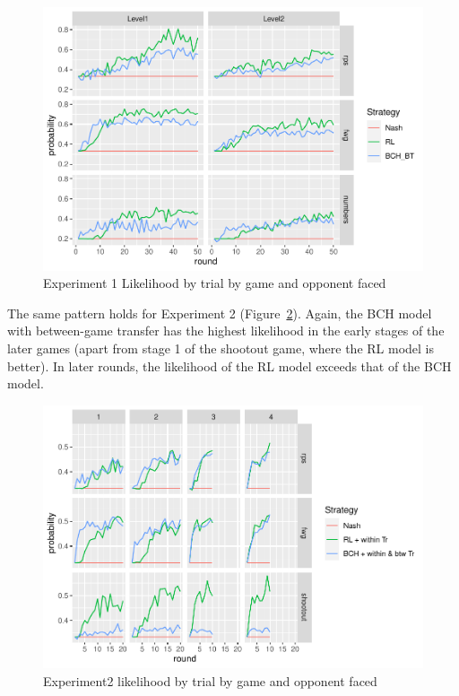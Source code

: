 \documentclass[man,floatsintext]{apa6}
\begin{document}
\begin{figure}

{\centering \includegraphics{paper_draft_2021_files/figure-latex/exp1-lik-by-tr-1} 

}

\caption{Experiment 1 Likelihood by trial by game and opponent faced}\label{fig:exp1-lik-by-tr}
\end{figure}

The same pattern holds for Experiment 2 (Figure~\ref{fig:exp2-lik-by-tr}). Again, the BCH model with between-game transfer has the highest likelihood in the early stages of the later games (apart from stage 1 of the shootout game, where the RL model is better). In later rounds, the likelihood of the RL model exceeds that of the BCH model.

\begin{figure}

{\centering \includegraphics{paper_draft_2021_files/figure-latex/exp2-lik-by-tr-1} 

}

\caption{Experiment2 likelihood by trial by game and opponent faced}\label{fig:exp2-lik-by-tr}
\end{figure}
\end{document}
